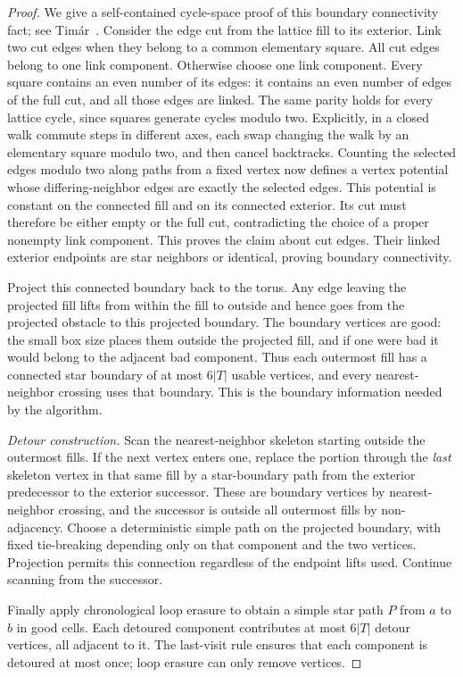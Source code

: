 \begin{proof}
We give a self-contained cycle-space proof of this boundary
connectivity fact; see Tim\'ar~\cite[arXiv version~2,
Lemmas~1--2]{Timar2013}. Consider the edge cut from the
lattice fill to its exterior. Link two cut edges when they belong
to a common elementary square. All cut edges belong to one link
component. Otherwise choose one link component. Every square
contains an even number of its edges: it contains an even number
of edges of the full cut, and all those edges are linked. The
same parity holds for every lattice cycle, since squares generate
cycles modulo two. Explicitly, in a closed walk commute steps in
different axes, each swap changing the walk by an elementary
square modulo two, and then cancel backtracks. Counting the
selected edges modulo two along paths from a fixed vertex now
defines a vertex potential whose differing-neighbor edges are
exactly the selected edges. This potential is constant on the
connected fill and on its connected exterior. Its cut must
therefore be either empty or the full cut, contradicting the
choice of a proper nonempty link component. This proves the claim
about cut edges. Their linked exterior endpoints are star
neighbors or identical, proving boundary connectivity.

Project this connected boundary back to the torus. Any edge
leaving the projected fill lifts from within the fill to outside
and hence goes from the projected obstacle to this projected
boundary. The boundary vertices are good: the small box size
places them outside the projected fill, and if one were bad it
would belong to the adjacent bad component. Thus each outermost
fill has a connected star boundary of at most \(6|T|\) usable
vertices, and every nearest-neighbor crossing uses that boundary.
This is the boundary information needed by the algorithm.

\emph{Detour construction.}
Scan the nearest-neighbor skeleton starting outside the outermost
fills. If the next vertex enters one, replace the portion through
the \emph{last} skeleton vertex in that same fill by a
star-boundary path from the exterior predecessor to the exterior
successor. These are boundary vertices by nearest-neighbor
crossing, and the successor is outside all outermost fills by
non-adjacency. Choose a deterministic simple path on the projected
boundary, with fixed tie-breaking depending only on that component
and the two vertices. Projection permits this connection regardless
of the endpoint lifts used. Continue scanning from the successor.

Finally apply chronological loop erasure to obtain a simple star
path \(P\) from \(a\) to \(b\) in good cells. Each detoured
component contributes at most \(6|T|\) detour vertices, all
adjacent to it. The last-visit rule ensures that each component
is detoured at most once; loop erasure can only remove vertices.


\end{proof}
